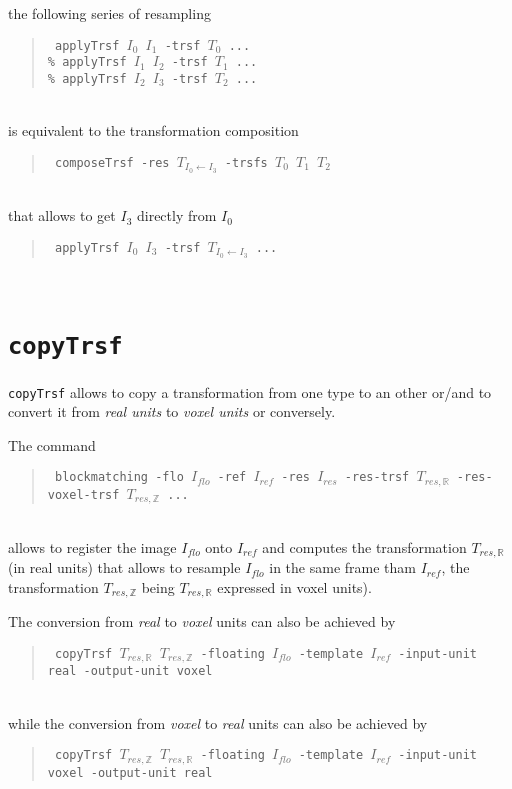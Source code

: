 \documentclass[10pt]{report}
\def\applyTrsf{\texttt{applyTrsf} }
\def\blockmatching{\texttt{blockmatching} }
\def\composeTrsf{\texttt{composeTrsf} }
\def\copyTrsf{\texttt{copyTrsf} }
\newenvironment{code}[1]{\mbox{}\\[1ex]\hspace*{-#1cm}\begin{minipage}{150mm}\begin{quote}\tt}{\end{quote}\end{minipage}\mbox{}\\[1ex]}
\begin{document}
 the following series of resampling
\begin{code}{1}
\% \applyTrsf $I_0$ $I_1$ -trsf $T_0$ ... \\
\% \applyTrsf $I_1$ $I_2$ -trsf $T_1$ ... \\
\% \applyTrsf $I_2$ $I_3$ -trsf $T_2$ ...
\end{code}
is equivalent to the transformation composition
\begin{code}{1}
\% \composeTrsf -res $T_{I_0 \leftarrow I_3}$ -trsfs $T_0$ $T_1$ $T_2$
\end{code}
that allows to get $I_3$ directly from $I_0$
\begin{code}{1}
\% \applyTrsf $I_0$ $I_3$ -trsf $T_{I_0 \leftarrow I_3}$ ... 
\end{code}





\section{\copyTrsf}


\copyTrsf allows to copy a transformation from one type to an other or/and to convert it from \textit{real units} to \textit{voxel units} or conversely.

The command
\begin{code}{0.8}
\% \blockmatching -flo $I_{flo}$ -ref $I_{ref}$ -res $I_{res}$ -res-trsf $T_{res,\mathbb{R}}$ -res-voxel-trsf $T_{res,\mathbb{Z}}$ ...
\end{code}
allows to register the image $I_{flo}$ onto $I_{ref}$ and computes the transformation 
$T_{res,\mathbb{R}}$ (in real units) that allows to resample $I_{flo}$ in the same frame tham $I_{ref}$, the transformation $T_{res,\mathbb{Z}}$ being $T_{res,\mathbb{R}}$ expressed in voxel units).

The conversion from \textit{real} to \textit{voxel} units can also be achieved by 
\begin{code}{0.8}
\% \copyTrsf $T_{res,\mathbb{R}}$ $T_{res,\mathbb{Z}}$ -floating $I_{flo}$ -template $I_{ref}$ -input-unit real -output-unit voxel
\end{code}
while the conversion from \textit{voxel} to \textit{real} units can also be achieved by 
\begin{code}{0.8}
\% \copyTrsf $T_{res,\mathbb{Z}}$ $T_{res,\mathbb{R}}$ -floating $I_{flo}$ -template $I_{ref}$ -input-unit voxel -output-unit real
\end{code}
\end{document}
